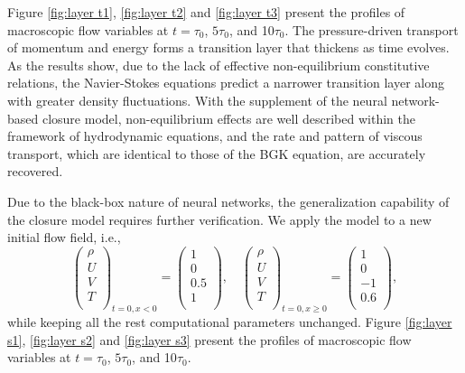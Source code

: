 \documentclass[preprint,3p,12pt,sort&compress]{elsarticle}
\begin{document}
Figure \ref{fig:layer t1}, \ref{fig:layer t2} and \ref{fig:layer t3} present the profiles of macroscopic flow variables at $t=\tau_0$, $5\tau_0$, and 10$\tau_0$.
The pressure-driven transport of momentum and energy forms a transition layer that thickens as time evolves.
As the results show, due to the lack of effective non-equilibrium constitutive relations, the Navier-Stokes equations predict a narrower transition layer along with greater density fluctuations.
With the supplement of the neural network-based closure model, non-equilibrium effects are well described within the framework of hydrodynamic equations, and the rate and pattern of viscous transport, which are identical to those of the BGK equation, are accurately recovered.

Due to the black-box nature of neural networks, the generalization capability of the closure model requires further verification.
We apply the model to a new initial flow field, i.e.,
\begin{equation}
    \left(\begin{array}{c}
    \rho \\
    U \\
    V \\
    T \\
    \end{array}\right)_{{t=0,x<0}}=\left(\begin{array}{c}
    1 \\
    0 \\
    0.5 \\
    1 \\
    \end{array}\right), \quad 
    \left(\begin{array}{c}
    \rho \\
    U \\
    V \\
    T \\
    \end{array}\right)_{{t=0,x\ge 0}}=\left(\begin{array}{c}
    1 \\
    0 \\
    -1 \\
    0.6 \\
    \end{array}\right),
\end{equation}
while keeping all the rest computational parameters unchanged.
Figure \ref{fig:layer s1}, \ref{fig:layer s2} and \ref{fig:layer s3} present the profiles of macroscopic flow variables at $t=\tau_0$, $5\tau_0$, and 10$\tau_0$.
\end{document}
